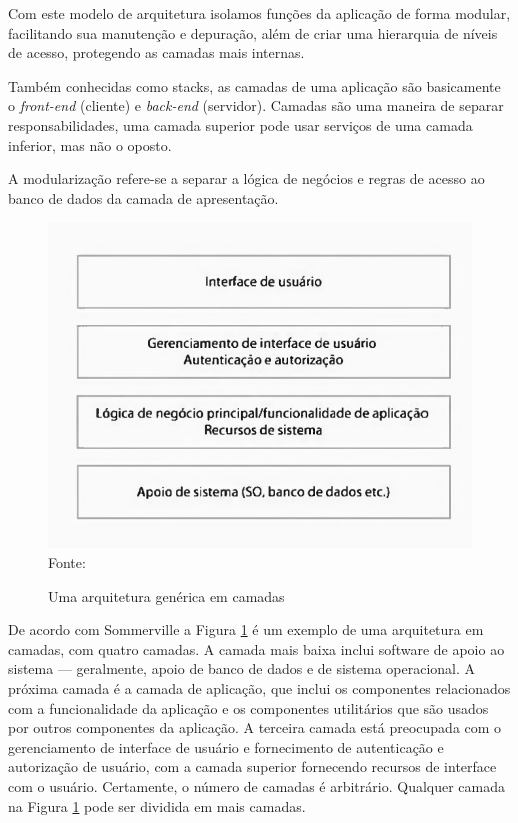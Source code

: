\documentclass[
	12pt,				%
	openright,			%
	twoside,			%
	a4paper,			%
	english,			%
	brazil				%
	]{abntex2}
\begin{document}
Com este modelo de arquitetura isolamos funções da aplicação de forma modular, facilitando sua manutenção e depuração, além de criar uma hierarquia de níveis de acesso, protegendo as camadas mais internas.

Também conhecidas como stacks, as camadas de uma aplicação são basicamente o \textit{front-end} (cliente) e \textit{back-end} (servidor). Camadas são uma maneira de separar responsabilidades, uma camada superior pode usar serviços de uma camada inferior, mas não o oposto. 

A modularização refere-se a separar a lógica de negócios e regras de acesso ao banco de dados da camada de apresentação.

\begin{figure}[h]
	\centering

	\caption{Uma arquitetura genérica em camadas} \label{fig:MultilayerArchitecture}
    \includegraphics[scale=0.4]{multilayer-architecture} \\
    Fonte: {\cite{sommerville_engenharia}} %

\end{figure}

De acordo com Sommerville\cite{sommerville_engenharia} a Figura \ref{fig:MultilayerArchitecture} é um exemplo de uma arquitetura em camadas, com quatro camadas. A camada mais baixa inclui software de apoio ao sistema — geralmente, apoio de banco de dados e de sistema operacional. A próxima camada é a camada de aplicação, que inclui os componentes relacionados com a funcionalidade da aplicação e os componentes utilitários que são usados por outros componentes da aplicação. A terceira camada está preocupada com o gerenciamento de interface de usuário e fornecimento de autenticação e autorização de usuário, com a camada superior fornecendo recursos de interface com o usuário. Certamente, o número de camadas é arbitrário. Qualquer camada na Figura \ref{fig:MultilayerArchitecture} pode ser dividida em mais camadas.
\end{document}
